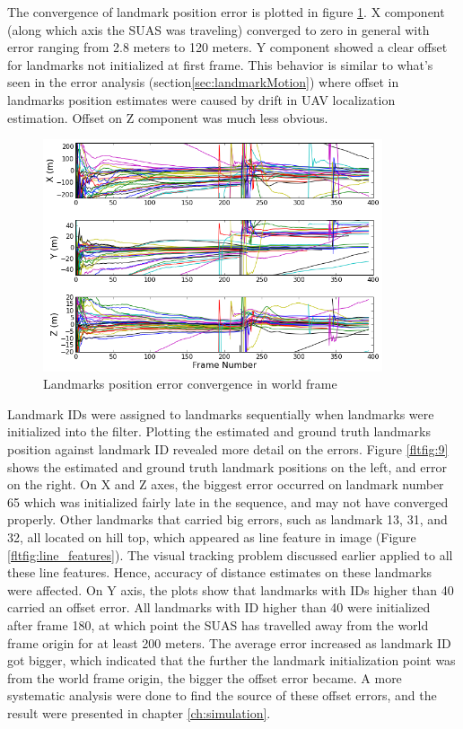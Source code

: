 The convergence of landmark position error is plotted in figure
\ref{fltfig:8}. X component (along which axis the SUAS was traveling)
converged to zero in general with error ranging from 2.8 meters to 120
meters. Y component showed a clear offset for landmarks not initialized
at first frame. This behavior is similar to what's seen in the
error analysis (section\ref{sec:landmarkMotion}) where offset in landmarks
position estimates were caused by drift in UAV localization
estimation. Offset on Z component was much less obvious.

\begin{figure}[h]
\centering
\includegraphics[width=10cm, keepaspectratio=true]
{./Figures/fltfig/cut1/Figure50.png}
\caption{Landmarks position error convergence in world frame}
\label{fltfig:8}
\end{figure}

Landmark IDs were assigned to landmarks sequentially when landmarks
were initialized into the filter. Plotting the estimated and ground
truth landmarks position against landmark ID revealed more detail on
the errors. Figure \ref{fltfig:9} shows the estimated and ground truth
landmark positions on the left, and error on the right. On X and Z
axes, the biggest error occurred on landmark number 65 which was
initialized fairly late in the sequence, and may not have converged
properly. Other landmarks that carried big errors, such as landmark
13, 31, and 32, all located on hill top, which appeared as line
feature in image (Figure \ref{fltfig:line_features}). The visual
tracking problem discussed earlier applied to all these line features.
Hence, accuracy of distance estimates on these landmarks were
affected. On Y axis, the plots show that landmarks with IDs higher
than 40 carried an offset error. All landmarks with ID higher than 40
were initialized after frame 180, at which point the SUAS has
travelled away from the world frame origin for at least 200 meters.
The average error increased as landmark ID got bigger, which indicated
that the further the landmark initialization point was from the world
frame origin, the bigger the offset error became. A more systematic
analysis were done to find the source of these offset errors, and the
result were presented in chapter \ref{ch:simulation}.

